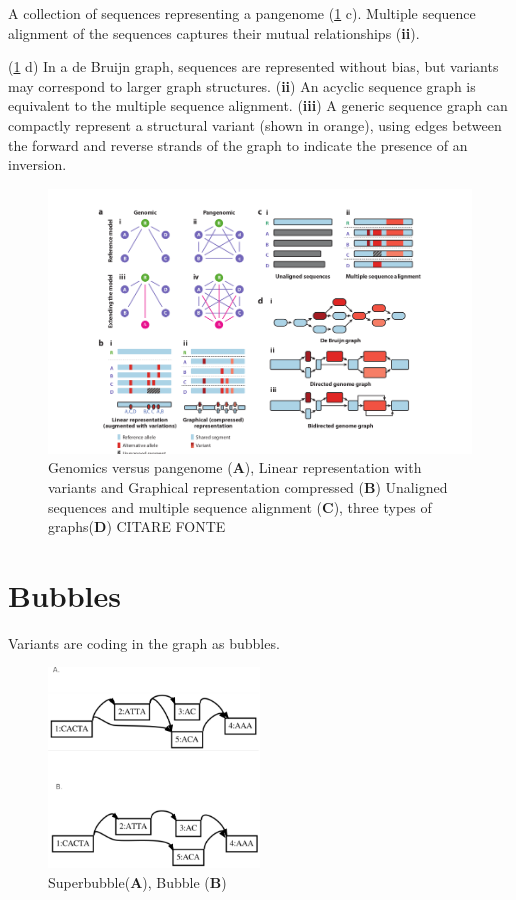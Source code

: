 A collection of sequences representing a pangenome (\ref{fig:genomevspangenome.png} c). Multiple sequence alignment of the sequences captures their mutual relationships (\textbf{ii}).

(\ref{fig:genomevspangenome.png} d) In a de Bruijn graph, sequences are represented without bias, but variants may
correspond to larger graph structures. (\textbf{ii}) An acyclic sequence graph is equivalent to the multiple sequence alignment. (\textbf{iii}) A generic sequence graph can compactly represent a structural variant (shown in orange), using edges between the forward and reverse strands of
the graph to indicate the presence of an inversion.


\begin{figure}[H]
\centering
\includegraphics[width=1.00\textwidth]{fig/pangenome_genome.png}
\decoRule
\caption{Genomics versus pangenome (\textbf{A}), Linear representation with variants and Graphical representation compressed (\textbf{B})  Unaligned sequences and multiple sequence alignment (\textbf{C}), three types of graphs(\textbf{D}) CITARE FONTE }
\label{fig:genomevspangenome.png}
\end{figure}

\section{Bubbles}

Variants are coding in the graph as bubbles. 

\begin{figure}[H]
\centering
\includegraphics[width=0.50\textwidth]{fig/sup_bub.png}
\decoRule
\caption{Superbubble(\textbf{A}), Bubble (\textbf{B})}
\label{fig:sup_bub.png}
\end{figure}


